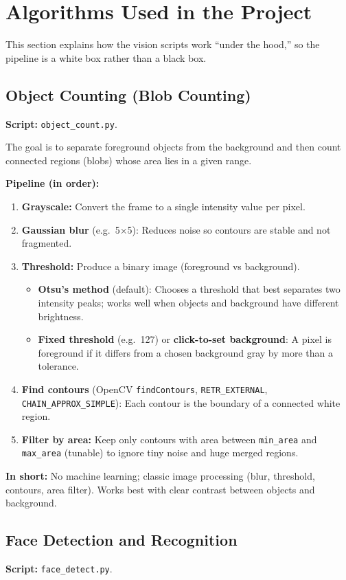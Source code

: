\documentclass[a4paper,12pt]{article}
\begin{document}
\section{Algorithms Used in the Project}
This section explains how the vision scripts work ``under the hood,'' so the pipeline is a white box rather than a black box.

\subsection{Object Counting (Blob Counting)}
\textbf{Script:} \texttt{object\_count.py}.

The goal is to separate foreground objects from the background and then count connected regions (blobs) whose area lies in a given range.

\textbf{Pipeline (in order):}
\begin{enumerate}
    \item \textbf{Grayscale:} Convert the frame to a single intensity value per pixel.
    \item \textbf{Gaussian blur} (e.g.\ 5$\times$5): Reduces noise so contours are stable and not fragmented.
    \item \textbf{Threshold:} Produce a binary image (foreground vs background).
        \begin{itemize}
            \item \textbf{Otsu's method} (default): Chooses a threshold that best separates two intensity peaks; works well when objects and background have different brightness.
            \item \textbf{Fixed threshold} (e.g.\ 127) or \textbf{click-to-set background}: A pixel is foreground if it differs from a chosen background gray by more than a tolerance.
        \end{itemize}
    \item \textbf{Find contours} (OpenCV \texttt{findContours}, \texttt{RETR\_EXTERNAL}, \texttt{CHAIN\_APPROX\_SIMPLE}): Each contour is the boundary of a connected white region.
    \item \textbf{Filter by area:} Keep only contours with area between \texttt{min\_area} and \texttt{max\_area} (tunable) to ignore tiny noise and huge merged regions.
\end{enumerate}
\textbf{In short:} No machine learning; classic image processing (blur, threshold, contours, area filter). Works best with clear contrast between objects and background.

\subsection{Face Detection and Recognition}
\textbf{Script:} \texttt{face\_detect.py}.
\end{document}
